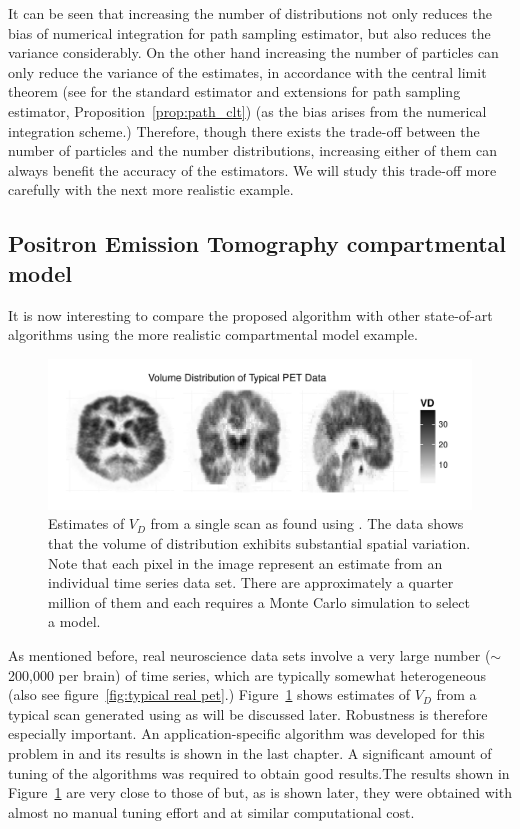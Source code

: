 It can be seen that increasing the number of distributions not only reduces
the bias of numerical integration for path sampling estimator, but also
reduces the variance considerably. On the other hand increasing the number of
particles can only reduce the variance of the estimates, in accordance with
the central limit theorem (see \cite{DelMoral:2006hc} for the standard
estimator and extensions for path sampling estimator,
Proposition~\ref{prop:path_clt}) (as the bias arises from the numerical
integration scheme.) Therefore, though there exists the trade-off between the
number of particles and the number distributions, increasing either of them
can always benefit the accuracy of the estimators. We will study this
trade-off more carefully with the next more realistic example.

\subsection{Positron Emission Tomography compartmental model}
\label{sub:Positron Emission Tomography compartmental model}

It is now interesting to compare the proposed algorithm with other
state-of-art algorithms using the more realistic \pet compartmental model
example.

\begin{figure}[t]
  \includegraphics[width=\linewidth]{fig/PETPlot-smc2-ps-bw}
  \caption{Estimates of $V_D$ from a single \pet scan as found using \smc[2].
    The data shows that the volume of distribution exhibits substantial
    spatial variation. Note that each pixel in the image represent an estimate
    from an individual time series data set. There are approximately a quarter
    million of them and each requires a Monte Carlo simulation to select a
    model.}
  \label{fig:petplot}
\end{figure}

As mentioned before, real neuroscience data sets involve a very large number
($\sim$200,000 per brain) of time series, which are typically somewhat
heterogeneous (also see figure~\ref{fig:typical real pet}.)
Figure~\ref{fig:petplot} shows estimates of $V_D$ from a typical \pet scan
generated using \smc[2] as will be discussed later. Robustness is therefore
especially important. An application-specific \mcmc algorithm was developed
for this problem in \cite{Zhou2013} and its results is shown in the last
chapter. A significant amount of tuning of the algorithms was required to
obtain good results.The results shown in Figure~\ref{fig:petplot} are very
close to those of \cite{Zhou2013} but, as is shown later, they were obtained
with almost no manual tuning effort and at similar computational cost.

